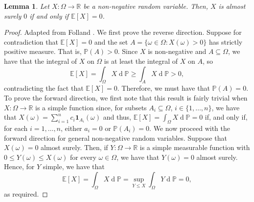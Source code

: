 \documentclass[a4paper,11pt]{article}
\DeclareMathOperator{\dee}{d}
\theoremstyle{plain}
\newtheorem{lemma}[theorem]{Lemma}
\theoremstyle{definition}
\begin{document}

\begin{lemma}\label{lem:expectation}
Let $X:\Omega \to \mathbb{R}$ be a non-negative random variable. Then, $X$ is almost surely $0$ if and only if $\mathbb{E}[X] = 0$.
\end{lemma}

\begin{proof} Adapted from Folland \citep[pp.~110--111]{GBF}. We first prove the reverse direction. Suppose for contradiction that $\mathbb{E}[X] = 0$ and the set $A = \{\omega \in \Omega: X(\omega) > 0\}$ has strictly positive measure. That is, $\mathbb{P}(A) > 0$. Since $X$ is non-negative and $A \subseteq \Omega$, we have that the integral of $X$ on $\Omega$ is at least the integral of $X$ on $A$, so
\[
\mathbb{E}[X] = \int_{\Omega} X {\dee}\mathbb{P} \geq \int_A X {\dee}\mathbb{P} > 0,
\]
contradicting the fact that $\mathbb{E}[X] = 0$. Therefore, we must have that $\mathbb{P}(A) = 0$. To prove the forward direction, we first note that this result is fairly trivial when $X:\Omega \to \mathbb{R}$ is a simple function since, for subsets $A_i \subseteq \Omega$, $i \in  \{1,\dots,n\}$, we have that $X(\omega) = \sum_{i=1}^n c_i \mathbf{1}_{A_i}(\omega)$ and thus, $\mathbb{E}[X] = \int_{\Omega} X{\dee}\mathbb{P} = 0$ if, and only if, for each $i = 1,\dots,n$, either $a_i = 0$ or $\mathbb{P}(A_i) = 0$. We now proceed with the forward direction for general non-negative random variables. Suppose that $X(\omega) = 0$ almost surely. Then, if $Y:\Omega \to \mathbb{R}$ is a simple measurable function with $0 \leq Y(\omega) \leq X(\omega)$ for every $\omega \in \Omega$, we have that $Y(\omega) = 0$ almost surely. Hence, for $Y$ simple, we have that
\[
\mathbb{E}[X] = \int_{\Omega} X {\dee}\mathbb{P} = \sup_{Y \leq X} \int_{\Omega} Y {\dee}\mathbb{P} = 0,
\]
as required.
\end{proof}


\end{document}
